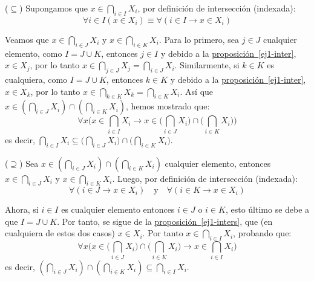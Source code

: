 \documentclass[letterpaper,DIV=14,headsepline,12pt]{scrartcl}
\makeatletter
\newcommand{\customRef}[2]{\hyperref[#1]{#2~\ref*{#1}}}
\renewenvironment{proof}[1][]{%
        \par\pushQED{\qed}%
        \normalfont\topsep6pt \partopsep0pt %
        \trivlist
        \item[\hskip\labelsep
                \textbf{\textit{Demostración.}}%
        ]#1
        }{%
        \popQED\endtrivlist\@endpefalse
    }
\makeatother
\begin{document}
    \begin{proof}
        ($\subseteq$) Supongamos que $x \in \bigcap_{i \in I} X_i$, por definición de intersección (indexada):
        \begin{equation}\label{ej1-inter}
            \forall i \in I (x \in X_i) \equiv \forall ( i \in I \to x \in X_i)
        \end{equation}

        Veamos que $x \in \bigcap_{i \in J} X_i$ y $x \in \bigcap_{i \in K} X_i$. Para lo primero, sea $j \in J$ cualquier elemento, como $I=J \cup K$, entonces $j \in I$ y debido a la \customRef{ej1-inter}{proposición}, $x \in X_j$, por lo tanto $x \in \bigcap_{j \in J} X_j = \bigcap_{i \in J} X_i$. Similarmente, si $k \in K$ es cualquiera, como $I=J \cup K$, entonces $k \in K$ y debido a la \customRef{ej1-inter}{proposición}, $x \in X_k$, por lo tanto $x \in \bigcap_{k \in K} X_k = \bigcap_{i \in K} X_i$. Así que $x \in ( \bigcap_{i \in J} X_i ) \cap ( \bigcap_{i \in K} X_i )$, hemos mostrado que:
        \[ \forall x \bigg( x \in \bigcap_{i \in I} X_i \to x \in \Big( \bigcap_{i \in J} X_i \Big) \cap \Big( \bigcap_{i \in K} X_i \Big) \bigg) \]
        es decir, $\bigcap_{i \in I} X_i \subseteq \Big( \bigcap_{i \in J} X_i \Big) \cap \Big( \bigcap_{i \in K} X_i \Big)$.

        ($\supseteq$) Sea $x \in ( \bigcap_{i \in J} X_i ) \cap ( \bigcap_{i \in K} X_i )$ cualquier elemento, entonces $x \in \bigcap_{i \in J} X_i$ y $x \in \bigcap_{i \in K} X_i$. Luego, por definición de intersección (indexada):
        \begin{equation}\label{ej1-inters}
            \forall ( i \in J \to x \in X_i) \quad \text{y} \quad \forall ( i \in K \to x \in X_i)
        \end{equation}
        
        Ahora, si $i \in I$ es cualquier elemento entonces $i \in J$ o $i \in K$, esto último se debe a que $I=J \cup K$. Por tanto, se sigue de la \customRef{ej1-inters}{proposición}, que (en cualquiera de estos dos casos) $x \in X_i$. Por tanto $x \in \bigcap_{i \in I}  X_i$, probando que:
        \[ \forall x \bigg( x \in \Big( \bigcap_{i \in J} X_i \Big) \cap \Big( \bigcap_{i \in K} X_i \Big) \to x\in \bigcap_{i \in I} X_i \bigg) \]
        es decir, $( \bigcap_{i \in J} X_i ) \cap ( \bigcap_{i \in K} X_i ) \subseteq \bigcap_{i \in I} X_i$.
    \end{proof}
\end{document}
